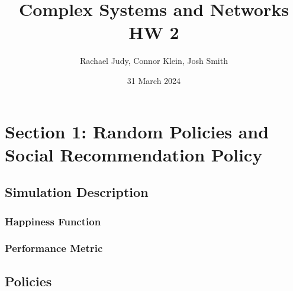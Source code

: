 \documentclass[12pt]{article}
\title{Complex Systems and Networks HW 2}
\author{Rachael Judy, Connor Klein, Josh Smith}
\date{31 March 2024}
\begin{document}
	\pgfplotsset{compat=1.18}
	
	\maketitle
	
\section{Section 1: Random Policies and Social Recommendation Policy}\label{sec:q1}
	\subsection{Simulation Description}\label{subsec:simulation}
	
	\subsubsection{Happiness Function}
	\subsubsection{Performance Metric}

	\subsection{Policies}\label{subsec:policies}
	
\end{document}

